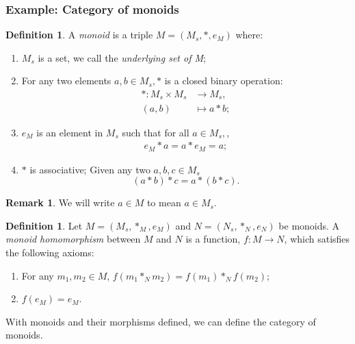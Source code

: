 \documentclass[11pt,a4paper]{article}
\theoremstyle{definition}
\newtheorem{definition}[thm]{Definition}
\newtheorem{remark}[thm]{Remark}
\numberwithin{equation}{section}
\begin{document}
\subsubsection{Example: Category of monoids}
\label{sss:catofmonexam}
\begin{definition}
\label{def:monoid1}
A \emph{monoid} is a triple $M=(M_{s},*,e_M)$ where:
\begin{enumerate}
    \item $M_{s}$ is a set, we call the \emph{underlying set of M};
    \item For any two elements $a,b\in M_{s}, *$ is a closed binary operation:
    \begin{align*}
        *\colon M_{s}\times M_{s} &\rightarrow M_{s},\\
        (a,b) &\mapsto a*b;
    \end{align*}
    \item $e_{M}$ is an element in $M_{s}$ such that for all $a\in M_{s},$,
    \begin{align*}
        e_{M}*a = a*e_{M} = a;
    \end{align*}
    \item $*$ is associative; Given any two $a,b,c\in M_{s}$ 
    \[(a*b)*c = a*(b*c).\]
\end{enumerate}
\end{definition}
\begin{remark}
We will write $a\in M$ to mean $a\in M_{s}$.
\end{remark}
\begin{definition}
\label{def:monhomo}
Let $M=(M_{s},*_{M},e_{M})$ and $N=(N_{s},*_{N},e_{N})$ be monoids. A \emph{monoid homomorphism} between $M$ and $N$ is a function, $f: M \rightarrow N$,
which satisfies the following axioms:
\begin{enumerate}
    \item For any $m_{1},m_{2}\in M$, $f(m_{1}*_{N}m_{2}) = f(m_{1})*_{N}f(m_{2})$;
    \item $f(e_{M})= e_{M}$.
\end{enumerate}
\end{definition}
With monoids and their morphisms defined, we can define the category of monoids.
\end{document}
